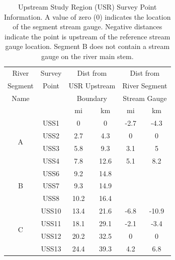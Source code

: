 \begin{linenumbers}
\begin{table}[htbp]
	\centering
	\caption[Upstream Study Region (USR) Survey Point Information.]{Upstream Study Region (USR) Survey Point Information.  A value of zero (0) indicates the location of the segment stream gauge.  Negative distances indicate the point is upstream of the reference stream gauge location. Segment B does not contain a stream gauge on the river main stem.}
	\label{tab:USRSurveyLoc}
	\begin{tabular}{cccccc}
		\toprule
		River                       & Survey &  \multicolumn{2}{c}{Dist from}   &   \multicolumn{2}{c}{Dist from}   \\
		Segment                      & Point  & \multicolumn{2}{c}{USR Upstream} & \multicolumn{2}{c}{River Segment} \\
		Name                        &        &   \multicolumn{2}{c}{Boundary}   & \multicolumn{2}{c}{Stream Gauge}  \\
		\cmidrule(r{.5em}l){3-4} \cmidrule(r{.5em}l){5-6} &        &  mi  &            km             &  mi  &             km             \\ \toprule
		\multirow{4}{*}{A}                 &  USS1  &  0   &             0             & -2.7 &            -4.3            \\
		&  USS2  & 2.7  &            4.3            &  0   &             0              \\
		&  USS3  & 5.8  &            9.3            & 3.1  &             5              \\
		&  USS4  & 7.8  &           12.6            & 5.1  &            8.2             \\ \midrule
		\multirow{3}{*}{B}                 &  USS6  & 9.2  &           14.8            &      &  \\
		&  USS7  & 9.3  &           14.9            &      &  \\
		&  USS8  & 10.2 &           16.4            &      &  \\ \midrule
		\multirow{5}{*}{C}                 & USS10  & 13.4 &           21.6            & -6.8 &           -10.9            \\
		& USS11  & 18.1 &           29.1            & -2.1 &            -3.4            \\
		& USS12  & 20.2 &           32.5            &  0   &             0              \\
		& USS13  & 24.4 &           39.3            & 4.2  &            6.8             \\

\end{tabular}
\end{table}
\end{linenumbers}
